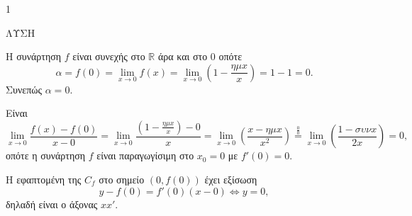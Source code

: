 \begin{ylh}{1}
    \item [Ύλη από εικόνα]
\end{ylh}
ΛΥΣΗ
\begin{alist}
\item Η συνάρτηση $f$ είναι συνεχής στο $\mathbb{R}$ άρα και στο $0$ οπότε
\[
\alpha = f(0) = \lim_{x\to0} f(x) = \lim_{x\to0} \left(1 - \frac{\eta\mu x}{x}\right) = 1 - 1 = 0.
\]
Συνεπώς $\alpha = 0.$
\item Είναι
\[
\lim_{x\to0} \frac{f(x)-f(0)}{x-0} = \lim_{x\to0} \frac{\left(1 - \frac{\eta\mu x}{x}\right) - 0}{x} = \lim_{x\to0} \left(\frac{x - \eta\mu x}{x^2}\right) \overset{\frac{0}{0}}{=} \lim_{x\to0} \left(\frac{1 - \sigma\upsilon\nu x}{2x}\right) = 0,
\]
οπότε η συνάρτηση $f$ είναι παραγωγίσιμη στο $x_0 = 0$ με $f'(0) = 0.$
\item Η εφαπτομένη της $C_f$ στο σημείο $(0, f(0))$ έχει εξίσωση
\[
y - f(0) = f'(0)(x-0) \Leftrightarrow y=0,
\]
δηλαδή είναι ο άξονας $xx'.$
\end{alist}